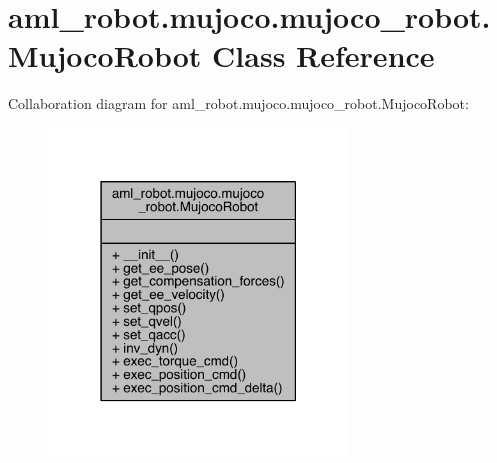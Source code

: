 \hypertarget{classaml__robot_1_1mujoco_1_1mujoco__robot_1_1_mujoco_robot}{}\section{aml\+\_\+robot.\+mujoco.\+mujoco\+\_\+robot.\+Mujoco\+Robot Class Reference}
\label{classaml__robot_1_1mujoco_1_1mujoco__robot_1_1_mujoco_robot}


Collaboration diagram for aml\+\_\+robot.\+mujoco.\+mujoco\+\_\+robot.\+Mujoco\+Robot\+:\nopagebreak
\begin{figure}[H]
\begin{center}
\leavevmode
\includegraphics[width=226pt]{classaml__robot_1_1mujoco_1_1mujoco__robot_1_1_mujoco_robot__coll__graph}
\end{center}
\end{figure}
